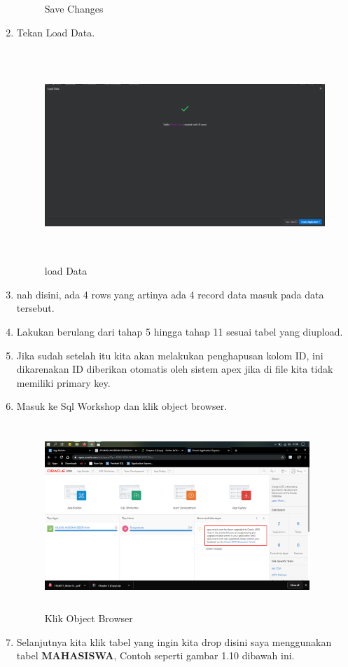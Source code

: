 \begin{enumerate}
\begin{figure}[!htbp]
\caption{Save Changes}
\label{penanda}
\end{figure}
\item Tekan Load Data.
\begin{figure}[!htbp]
\centering
\includegraphics[width=11cm,height=8cm]{figures/G1.PNG}
\caption{load Data}
\label{penanda}
\end{figure}
\item nah disini, ada 4 rows yang artinya ada 4 record data masuk pada data tersebut.
\item  Lakukan berulang dari tahap 5 hingga tahap 11 sesuai tabel yang diupload.
\item  Jika sudah setelah itu kita akan melakukan penghapusan kolom ID, ini dikarenakan ID diberikan otomatis oleh sistem apex jika di file kita tidak memiliki primary key.
\item Masuk ke Sql Workshop dan klik object browser.
\begin{figure}[!htbp]
\centering
\includegraphics[width=10cm,height=7cm]{figures/9.PNG}
\caption{Klik Object Browser}
\label{penanda}
\end{figure}
\item Selanjutnya kita klik tabel yang ingin kita drop disini saya menggunakan tabel \textbf{MAHASISWA}, Contoh seperti gambar 1.10 dibawah ini.

\end{enumerate}
